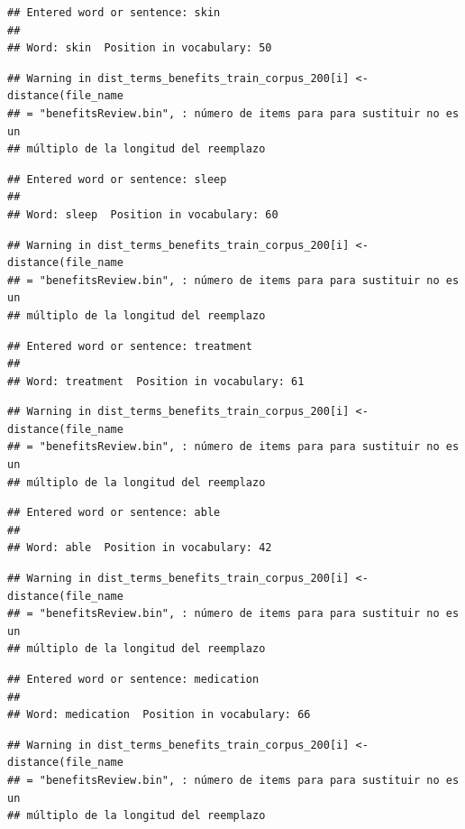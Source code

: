 \documentclass[spanish,]{article}
\begin{document}
\begin{verbatim}
## Entered word or sentence: skin
## 
## Word: skin  Position in vocabulary: 50
\end{verbatim}

\begin{verbatim}
## Warning in dist_terms_benefits_train_corpus_200[i] <- distance(file_name
## = "benefitsReview.bin", : número de items para para sustituir no es un
## múltiplo de la longitud del reemplazo
\end{verbatim}

\begin{verbatim}
## Entered word or sentence: sleep
## 
## Word: sleep  Position in vocabulary: 60
\end{verbatim}

\begin{verbatim}
## Warning in dist_terms_benefits_train_corpus_200[i] <- distance(file_name
## = "benefitsReview.bin", : número de items para para sustituir no es un
## múltiplo de la longitud del reemplazo
\end{verbatim}

\begin{verbatim}
## Entered word or sentence: treatment
## 
## Word: treatment  Position in vocabulary: 61
\end{verbatim}

\begin{verbatim}
## Warning in dist_terms_benefits_train_corpus_200[i] <- distance(file_name
## = "benefitsReview.bin", : número de items para para sustituir no es un
## múltiplo de la longitud del reemplazo
\end{verbatim}

\begin{verbatim}
## Entered word or sentence: able
## 
## Word: able  Position in vocabulary: 42
\end{verbatim}

\begin{verbatim}
## Warning in dist_terms_benefits_train_corpus_200[i] <- distance(file_name
## = "benefitsReview.bin", : número de items para para sustituir no es un
## múltiplo de la longitud del reemplazo
\end{verbatim}

\begin{verbatim}
## Entered word or sentence: medication
## 
## Word: medication  Position in vocabulary: 66
\end{verbatim}

\begin{verbatim}
## Warning in dist_terms_benefits_train_corpus_200[i] <- distance(file_name
## = "benefitsReview.bin", : número de items para para sustituir no es un
## múltiplo de la longitud del reemplazo
\end{verbatim}
\end{document}

